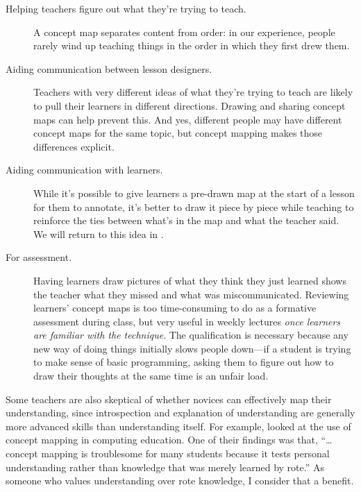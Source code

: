 \begin{description}

\item[Helping teachers figure out what they're trying to teach.]
  A concept map separates content from order:
  in our experience,
  people rarely wind up teaching things in the order in which they first drew them.

\item[Aiding communication between lesson designers.]
  Teachers with very different ideas of what they're trying to teach
  are likely to pull their learners in different directions.
  Drawing and sharing concept maps can help prevent this.
  And yes,
  different people may have different concept maps for the same topic,
  but concept mapping makes those differences explicit.

\item[Aiding communication with learners.]
  While it's possible to give learners a pre-drawn map at the start of a lesson for them to annotate,
  it's better to draw it piece by piece while teaching
  to reinforce the ties between what's in the map and what the teacher said.
  We will return to this idea in .

\item[For assessment.]
  Having learners draw pictures of what they think they just learned
  shows the teacher what they missed and what was miscommunicated.
  Reviewing learners' concept maps is too time-consuming to do as a formative assessment during class,
  but very useful in weekly lectures \emph{once learners are familiar with the technique}.
  The qualification is necessary because
  any new way of doing things initially slows people down---if a student is trying to make sense of basic programming,
  asking them to figure out how to draw their thoughts at the same time is an unfair load.

\end{description}

Some teachers are also skeptical of whether novices can effectively map their understanding,
since introspection and explanation of understanding are generally more advanced skills than understanding itself.
For example,
\cite{Kepp2008} looked at the use of concept mapping in computing education.
One of their findings was that,
``{\ldots}concept mapping is troublesome for many students because
it tests personal understanding rather than knowledge that was merely learned by rote.''
As someone who values understanding over rote knowledge,
I consider that a benefit.

